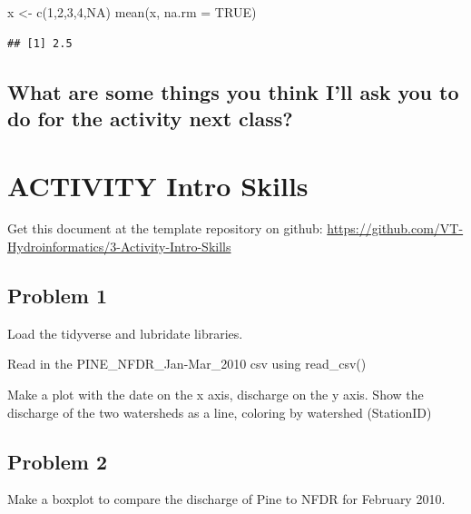 \documentclass[
]{book}
\newenvironment{Shaded}{\begin{snugshade}}{\end{snugshade}}
\newcommand{\AttributeTok}[1]{\textcolor[rgb]{0.77,0.63,0.00}{#1}}
\newcommand{\ConstantTok}[1]{\textcolor[rgb]{0.00,0.00,0.00}{#1}}
\newcommand{\DecValTok}[1]{\textcolor[rgb]{0.00,0.00,0.81}{#1}}
\newcommand{\FunctionTok}[1]{\textcolor[rgb]{0.00,0.00,0.00}{#1}}
\newcommand{\NormalTok}[1]{#1}
\newcommand{\OtherTok}[1]{\textcolor[rgb]{0.56,0.35,0.01}{#1}}
\begin{document}
\begin{Shaded}
\begin{Highlighting}[]
\NormalTok{x }\OtherTok{\textless{}{-}} \FunctionTok{c}\NormalTok{(}\DecValTok{1}\NormalTok{,}\DecValTok{2}\NormalTok{,}\DecValTok{3}\NormalTok{,}\DecValTok{4}\NormalTok{,}\ConstantTok{NA}\NormalTok{)}
\FunctionTok{mean}\NormalTok{(x, }\AttributeTok{na.rm =} \ConstantTok{TRUE}\NormalTok{)}
\end{Highlighting}
\end{Shaded}

\begin{verbatim}
## [1] 2.5
\end{verbatim}

\hypertarget{what-are-some-things-you-think-ill-ask-you-to-do-for-the-activity-next-class}{%
\section{What are some things you think I'll ask you to do for the activity next class?}\label{what-are-some-things-you-think-ill-ask-you-to-do-for-the-activity-next-class}}

\hypertarget{introactivity}{%
\chapter{ACTIVITY Intro Skills}\label{introactivity}}

Get this document at the template repository on github: \url{https://github.com/VT-Hydroinformatics/3-Activity-Intro-Skills}

\hypertarget{problem-1}{%
\section{Problem 1}\label{problem-1}}

Load the tidyverse and lubridate libraries.

Read in the PINE\_NFDR\_Jan-Mar\_2010 csv using read\_csv()

Make a plot with the date on the x axis, discharge on the y axis. Show the discharge of the two watersheds as a line, coloring by watershed (StationID)

\hypertarget{problem-2}{%
\section{Problem 2}\label{problem-2}}

Make a boxplot to compare the discharge of Pine to NFDR for February 2010.
\end{document}
